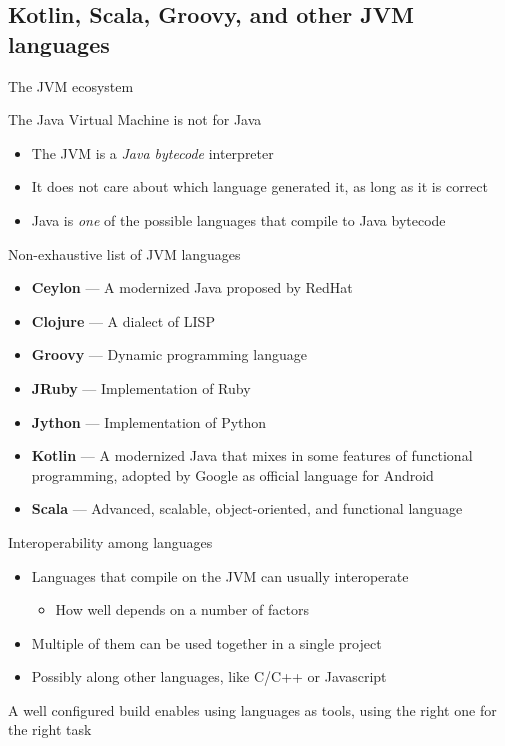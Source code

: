 \documentclass[presentation]{beamer}
\begin{document}
\subsection{Kotlin, Scala, Groovy, and other JVM languages}

\begin{frame}[fragile]{The JVM ecosystem}
    \begin{block}{The Java Virtual Machine is not for Java}
        \begin{itemize}
            \item The JVM is a \textit{Java bytecode} interpreter
            \item It does not care about which language generated it, as long as it is correct
            \item Java is \textit{one} of the possible languages that compile to Java bytecode
        \end{itemize}
    \end{block}
    \begin{block}{Non-exhaustive list of JVM languages}
        \scriptsize
        \begin{itemize}
            \item \textbf{Ceylon} --- A modernized Java proposed by RedHat
            \item \textbf{Clojure} --- A dialect of LISP
            \item \textbf{Groovy} --- Dynamic programming language
            \item \textbf{JRuby} --- Implementation of Ruby
            \item \textbf{Jython} --- Implementation of Python
            \item \textbf{Kotlin} --- A modernized Java that mixes in some features of functional programming, adopted by Google as official language for Android
            \item \textbf{Scala} --- Advanced, scalable, object-oriented, and functional language
        \end{itemize}
    \end{block}
\end{frame}

\begin{frame}[fragile]{Interoperability among languages}
    \begin{itemize}
        \item Languages that compile on the JVM can usually interoperate
        \begin{itemize}
            \item How well depends on a number of factors
        \end{itemize}
        \item Multiple of them can be used together in a single project
        \item Possibly along other languages, like C/C++ or Javascript
    \end{itemize}
    A well configured build enables using languages as tools, using the right one for the right task
\end{frame}
\end{document}
